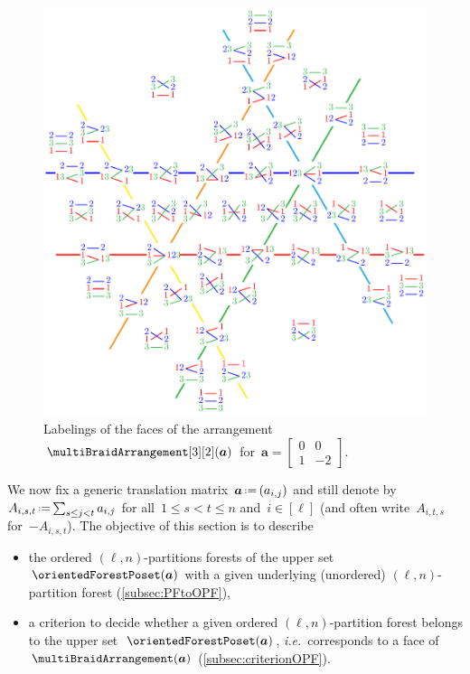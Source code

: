 \documentclass{amsart}
\theoremstyle{definition}
\renewcommand{\b}[1]{{\boldsymbol{#1}}} %
\newcommand{\eqdef}{\mbox{\,\raisebox{0.2ex}{\scriptsize\ensuremath{\mathrm:}}\ensuremath{=}\,}} %
\newcommand{\ie}{\textit{i.e.}~} %
\renewcommand{\b}[1]{\boldsymbol{#1}} %
\begin{document}
\begin{figure}
	\includegraphics[scale=.9]{B23b}
	\caption{Labelings of the faces of the arrangement~$\multiBraidArrangement[3][2](\b{a})$ for~$\b{a} = \begin{bmatrix} 0 & 0 \\ 1 & -2 \end{bmatrix}$.}
	\label{fig:B23b}
\end{figure}

We now fix a generic translation matrix~$\b{a} \eqdef (a_{i,j})$ and still denote by~$A_{i,s,t} \eqdef \smash{\sum_{s \le j < t} a_{i,j}}$ for all~$1 \le s < t \le n$ and~$i \in [\ell]$ (and often write~$A_{i,t,s}$ for~$-A_{i,s,t}$).
The objective of this section is to describe
\begin{itemize}
\item the ordered $(\ell,n)$-partitions forests of the upper set~$\orientedForestPoset(\b{a})$ with a given underlying (unordered) $(\ell,n)$-partition forest (\cref{subsec:PFtoOPF}),
\item a criterion to decide whether a given ordered $(\ell,n)$-partition forest belongs to the upper set~$\orientedForestPoset(\b{a})$, \ie corresponds to a face of~$\multiBraidArrangement(\b{a})$ (\cref{subsec:criterionOPF}).
\end{itemize}
\end{document}
